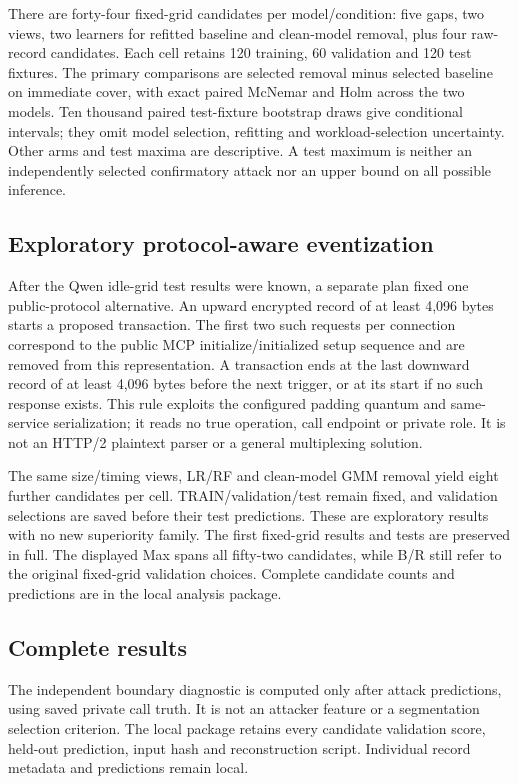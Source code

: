 There are forty-four fixed-grid candidates per model/condition: five gaps, two views, two learners for refitted baseline and clean-model removal, plus four raw-record candidates. Each cell retains 120 training, 60 validation and 120 test fixtures. The primary comparisons are selected removal minus selected baseline on immediate cover, with exact paired McNemar and Holm across the two models. Ten thousand paired test-fixture bootstrap draws give conditional intervals; they omit model selection, refitting and workload-selection uncertainty. Other arms and test maxima are descriptive. A test maximum is neither an independently selected confirmatory attack nor an upper bound on all possible inference.

\subsection{Exploratory protocol-aware eventization}
After the Qwen idle-grid test results were known, a separate plan fixed one public-protocol alternative. An upward encrypted record of at least 4,096 bytes starts a proposed transaction. The first two such requests per connection correspond to the public MCP initialize/initialized setup sequence and are removed from this representation. A transaction ends at the last downward record of at least 4,096 bytes before the next trigger, or at its start if no such response exists. This rule exploits the configured padding quantum and same-service serialization; it reads no true operation, call endpoint or private role. It is not an HTTP/2 plaintext parser or a general multiplexing solution.

The same size/timing views, LR/RF and clean-model GMM removal yield eight further candidates per cell. TRAIN/validation/test remain fixed, and validation selections are saved before their test predictions. These are exploratory results with no new superiority family. The first fixed-grid results and tests are preserved in full. The displayed Max spans all fifty-two candidates, while B/R still refer to the original fixed-grid validation choices. Complete candidate counts and predictions are in the local analysis package.

\subsection{Complete results}



The independent boundary diagnostic is computed only after attack predictions, using saved private call truth. It is not an attacker feature or a segmentation selection criterion. The local package retains every candidate validation score, held-out prediction, input hash and reconstruction script. Individual record metadata and predictions remain local.
